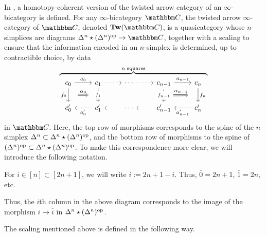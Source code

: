 \documentclass[main.tex]{subfiles}
\begin{document}
In \cite{garcia2020enhanced}, a homotopy-coherent version of the twisted arrow category of an $\infty$-bicategory is defined. For any $\infty$-bicategory $\CC$, the twisted arrow $\infty$-category of $\CC$, denoted $\Tw(\CC)$, is a quasicategory whose $n$-simplices are diagrams $\Delta^{n} \star (\Delta^{n})\op \to \CC$, together with a scaling to ensure that the information encoded in an $n$-simplex is determined, up to contractible choice, by data
\begin{equation*}
  \overbrace{
    \begin{tikzcd}[ampersand replacement=\&]
      c_{0}
      \arrow[r, "a_{0}"]
      \arrow[d, "f_{0}"{swap}, ""{name=L1}]
      \& c_{1}
      \arrow[d, "f_{1}"{description}, ""{swap, name=R1}]
      \arrow[r, dotted]
      \& \cdots
      \arrow[r, dotted]
      \& c_{n-1}
      \arrow[r, "a_{n-1}"]
      \arrow[d, "f_{n-1}"{description}, ""{name=Ln}]
      \& c_{n}
      \arrow[d, "f_{n}", ""{swap, name=Rn}]
      \\
      c'_{0}
      \& c'_{1}
      \arrow[l, "a'_{0}"]
      \& \cdots
      \arrow[l, dotted]
      \& c'_{n-1}
      \arrow[l, dotted]
      \& c'_{n}
      \arrow[l, "a'_{n-1}"]
      \arrow[from=L1, to=R1, Rightarrow, "\alpha_{0}", shorten=2ex]
      \arrow[from=Ln, to=Rn, Rightarrow, "\alpha_{n-1}", shorten=2ex]
    \end{tikzcd}
  }^{n\text{ squares}}
\end{equation*}
in $\CC$. Here, the top row of morphisms corresponds to the spine of the $n$-simplex $\Delta^{n} \subset \Delta^{n} \star (\Delta^{n})^{\mathrm{op}}$, and the bottom row of morphisms to the spine of $(\Delta^{n})^{\mathrm{op}} \subset \Delta^{n} \star (\Delta^{n})^{\mathrm{op}}$. To make this correspondence more clear, we will introduce the following notation.

\begin{notation}
  For $i \in [n] \subset [2n+1]$, we will write $\overline{i} := 2n+1-i$. Thus, $\overline{0} = 2n+1$, $\overline{1} = 2n$, etc.
\end{notation}

Thus, the $i$th column in the above diagram corresponds to the image of the morphism $i \to \overline{i}$ in $\Delta^{n} \star (\Delta^{n})^{\mathrm{op}}$.

The scaling mentioned above is defined in the following way.
\end{document}
